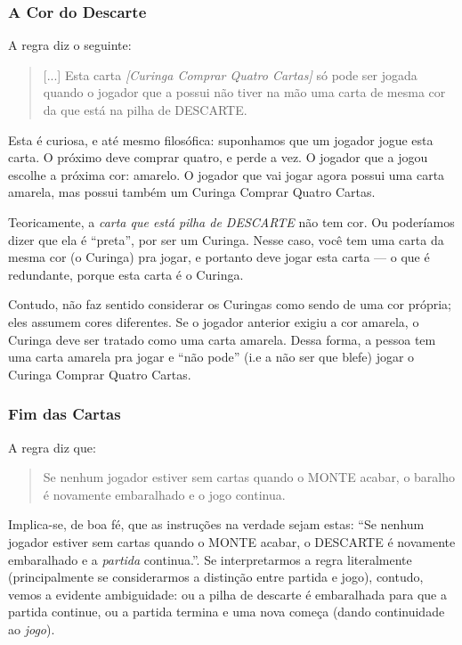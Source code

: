 \subsubsection{A Cor do Descarte}

A regra diz o seguinte:

\begin{quote}
[...] Esta carta \textit{[Curinga Comprar Quatro Cartas]} só pode ser jogada quando o jogador que a possui não tiver na mão uma carta de mesma cor da que está na pilha de DESCARTE.
\end{quote}

Esta é curiosa, e até mesmo filosófica: suponhamos que um jogador jogue esta carta. O próximo deve comprar quatro, e perde a vez. O jogador que a jogou escolhe a próxima cor: amarelo. O jogador que vai jogar agora possui uma carta amarela, mas possui também um Curinga Comprar Quatro Cartas.

Teoricamente, a \textit{carta que está pilha de DESCARTE} não tem cor. Ou poderíamos dizer que ela é ``preta'', por ser um Curinga. Nesse caso, você tem uma carta da mesma cor (o Curinga) pra jogar, e portanto deve jogar esta carta --- o que é redundante, porque esta carta é o Curinga.

Contudo, não faz sentido considerar os Curingas como sendo de uma cor própria; eles assumem cores diferentes. Se o jogador anterior exigiu a cor amarela, o Curinga deve ser tratado como uma carta amarela. Dessa forma, a pessoa tem uma carta amarela pra jogar e ``não pode'' (i.e a não ser que blefe) jogar o Curinga Comprar Quatro Cartas.

\subsubsection{Fim das Cartas}

A regra diz que:

\begin{quote}
Se nenhum jogador estiver sem cartas quando o MONTE acabar, o baralho é novamente embaralhado e o jogo continua.
\end{quote}

Implica-se, de boa fé, que as instruções na verdade sejam estas: ``Se nenhum jogador estiver sem cartas quando o MONTE acabar, o DESCARTE é novamente embaralhado e a \textit{partida} continua.''. Se interpretarmos a regra literalmente (principalmente se considerarmos a distinção entre partida e jogo), contudo, vemos a evidente ambiguidade: ou a pilha de descarte é embaralhada para que a partida continue, ou a partida termina e uma nova começa (dando continuidade ao \textit{jogo}).

